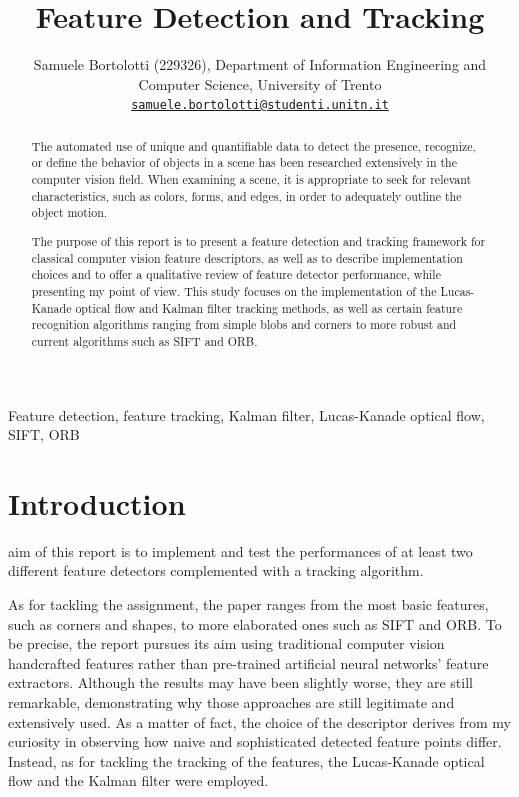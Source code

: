 \documentclass[journal]{IEEEtran}
\begin{document}

\title{Feature Detection and Tracking}

\author{Samuele Bortolotti (229326), Department of Information Engineering and Computer Science, University of Trento\\
\href{mailto:samuele.bortolotti@studenti.unitn.it}{\texttt{samuele.bortolotti@studenti.unitn.it}} }

\maketitle

\begin{abstract}
The automated use of unique and quantifiable data to detect the presence, recognize, or define the behavior of objects in a scene has been researched extensively in the computer vision field. When examining a scene, it is appropriate to seek for relevant characteristics, such as colors, forms, and edges, in order to adequately outline the object motion. 

The purpose of this report is to present a feature detection and tracking framework for classical computer vision feature descriptors, as well as to describe implementation choices and to offer a qualitative review of feature detector performance, while presenting my point of view. This study focuses on the implementation of the Lucas-Kanade optical flow and Kalman filter tracking methods, as well as certain feature recognition algorithms ranging from simple blobs and corners to more robust and current algorithms such as SIFT and ORB.
\end{abstract}

\begin{IEEEkeywords}
Feature detection, feature tracking, Kalman filter, Lucas-Kanade optical flow, SIFT, ORB
\end{IEEEkeywords}

\IEEEpeerreviewmaketitle


\section{Introduction}

 aim of this report is to implement and test the performances of at least two different feature detectors complemented with a tracking algorithm. 

As for tackling the assignment, the paper ranges from the most basic features, such as corners and shapes, to more elaborated ones such as SIFT and ORB.
To be precise, the report pursues its aim using traditional computer vision handcrafted features rather than pre-trained artificial neural networks' feature extractors. Although the results may have been slightly worse, they are still remarkable, demonstrating why those approaches are still legitimate and extensively used. As a matter of fact, the choice of the descriptor derives from my curiosity in observing how naive and sophisticated detected feature points differ. Instead, as for tackling the tracking of the features, the Lucas-Kanade optical flow and the Kalman filter were employed.
\end{document}
